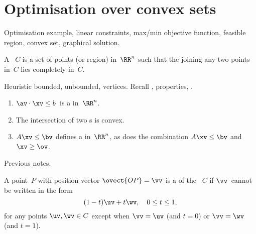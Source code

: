 
\chapter{Optimisation over convex sets}

\begin{comment}
Convex sets has pedagogical value: it revises previous material in a new context, it introduces modelling techniques, it sets a systematic tone for the course, it prepares students for further courses.
\end{comment}

\begin{remark} Optimisation example, linear constraints, max/min objective function, feasible region, convex set, graphical solution.
\end{remark}

\begin{definition}
 A ~$C$ is a set of points (or region) in~$\RR^n$ such that the  joining any two points in~$C$
lies completely in~$C$.
\end{definition}

\begin{remark}
Heuristic bounded, unbounded, vertices.
Recall , properties, .
\end{remark}


\begin{theorem} \label{thm:}
\begin{enumerate}
\item $\av\cdot\xv\leq b$~is a  in~$\RR^{n}$.
\item The intersection of two s is convex.
\item $A\xv\le \bv$ defines a  in~$\RR^n$, as does 
the combination $A\xv\le \bv$ and $\xv\ge \ov$.
\end{enumerate}
\end{theorem}
\begin{prof} Previous notes.
\end{prof}


\begin{definition}
A point~$P$ with position vector 
$\ovect{OP} ={\vv}$ 
is a  of the ~$C$ if ${\vv}$~cannot be written in
the form
\begin{equation*}
(1-t){\uv}+t{\wv},\quad 0\leq t\leq 1,
\end{equation*}
for any points ${\uv},{\wv}\in C$ except when ${\vv}= {\uv}$ (and
$t=0$) or ${\vv}={\wv}$ (and $t=1$).
\end{definition}


